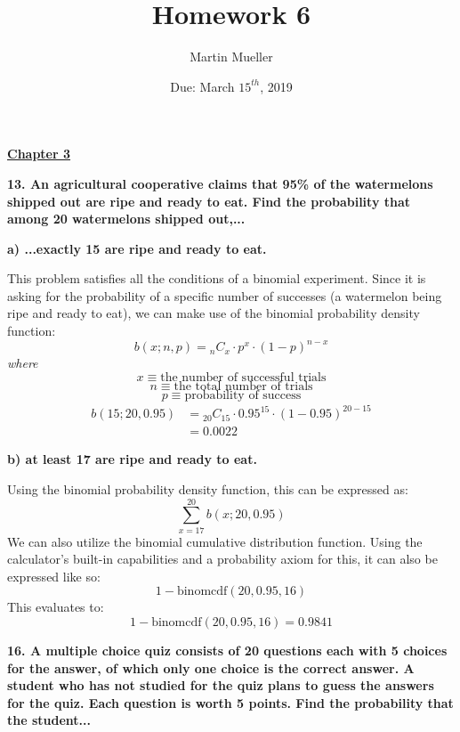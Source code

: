 \documentclass[12pt, letter]{article}
\title{Homework 6}
\author{Martin Mueller}
\date{Due: March $15^{th}$, 2019}
\begin{document}
\maketitle

\begin{center}
	\underline{\textbf{Chapter 3}}
\end{center}

\textbf{13. An agricultural cooperative claims that 95\% of the watermelons shipped out are ripe and ready to eat.  Find the probability that among 20 watermelons shipped out,...}

\qquad \textbf{a) ...exactly 15 are ripe and ready to eat.}
\begin{center}
	This problem satisfies all the conditions of a binomial experiment. Since it is asking for the probability of a specific number of successes (a watermelon being ripe and ready to eat), we can make use of the binomial probability density function:
	$$b(x;n,p) = {}_{n}C_{x} \cdot p^{x} \cdot (1-p)^{n-x}$$
	\textit{where}
	$$x \equiv \text{the number of successful trials}$$
	$$n \equiv \text{the total number of trials}$$
	$$p \equiv \text{probability of success}$$
	\begin{align*}
		b(15;20,0.95) &= {}_{20}C_{15} \cdot 0.95^{15} \cdot (1-0.95)^{20-15} \\
		&= \boxed{0.0022}
	\end{align*}
\end{center}

\pagebreak

\qquad \textbf{b) at least 17 are ripe and ready to eat.}
\begin{center}
	Using the binomial probability density function, this can be expressed as:
	$$\sum_{x=17}^{20} b(x;20,0.95)$$
	We can also utilize the binomial cumulative distribution function. Using the calculator's built-in capabilities and a probability axiom for this, it can also be expressed like so:
	$$1 - \text{binomcdf}(20,0.95,16)$$
	This evaluates to:
	$$1 - \text{binomcdf}(20,0.95,16)=\boxed{0.9841}$$
\end{center}

\textbf{16. A multiple choice quiz consists of 20 questions each with 5 choices for the answer, of which only one choice is the correct answer. A student who has not studied for the quiz plans to guess the answers for the quiz. Each question is worth 5 points. Find the probability that the student...}
\end{document}
